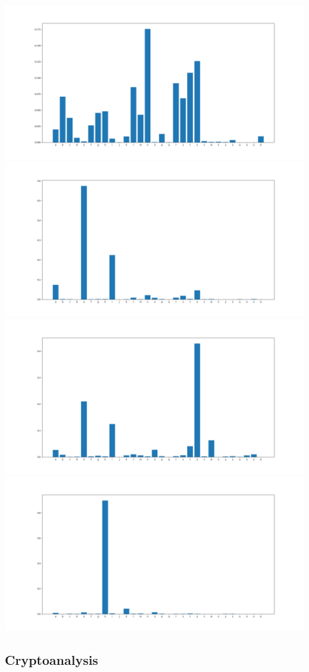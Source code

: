 \documentclass{article}
\begin{document}
\begin{itemize}
\includegraphics[width=\textwidth]{./plots/ahistory}
\includegraphics[width=\textwidth]{./plots/dhistory}
\includegraphics[width=\textwidth]{./plots/zhistory}
\includegraphics[width=\textwidth]{./plots/chistory}

\end{itemize}

\subsection{Cryptoanalysis}

\end{document}
